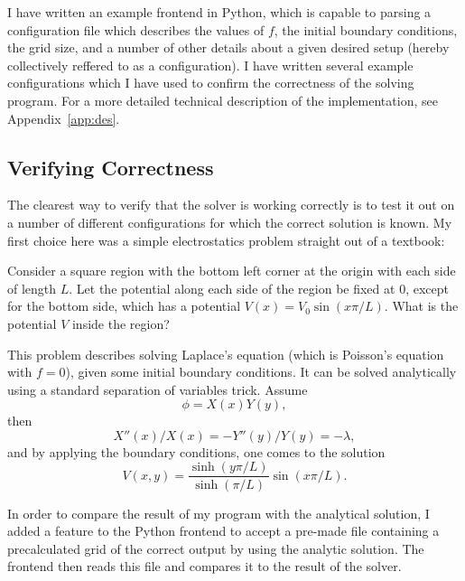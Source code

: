 I have written an example frontend in Python, which is capable to parsing a configuration file which describes the
values of $f$, the initial boundary conditions, the grid size, and a number of other details about a given desired
setup (hereby collectively reffered to as a configuration). I have written several example configurations which I have used to
confirm the correctness of the solving program. For a more detailed technical description of the implementation, see Appendix~\ref{app:des}.

\subsection{Verifying Correctness}

The clearest way to verify that the solver is working correctly is to test it out on a number of different configurations
for which the correct solution is known. My first choice here was a simple electrostatics problem straight out of a textbook:

\begin{addmargin}[2em]{2em}%
	Consider a square region with the bottom left corner at the origin with each side of length $L$. Let the potential
	along each side of the region be fixed at 0, except for the bottom side, which has a potential $V(x) = V_0 \sin(x \pi / L)$.
	What is the potential $V$ inside the region?
\end{addmargin}

This problem describes solving Laplace's equation (which is Poisson's equation with $f=0$), given some initial boundary conditions.
It can be solved analytically using a standard separation of variables trick. Assume
$$\phi = X(x) Y(y),$$
then
$$X''(x)/X(x) = -Y''(y)/Y(y) = -\lambda,$$
and by applying the boundary conditions, one comes to the solution
$$V(x,y) = \frac{\sinh(y \pi / L)}{\sinh(\pi / L)} \sin(x \pi / L).$$

In order to compare the result of my program with the analytical solution, I added a feature to the Python frontend
to accept a pre-made file containing a precalculated grid of the correct output by using the analytic solution. The
frontend then reads this file and compares it to the result of the solver.

